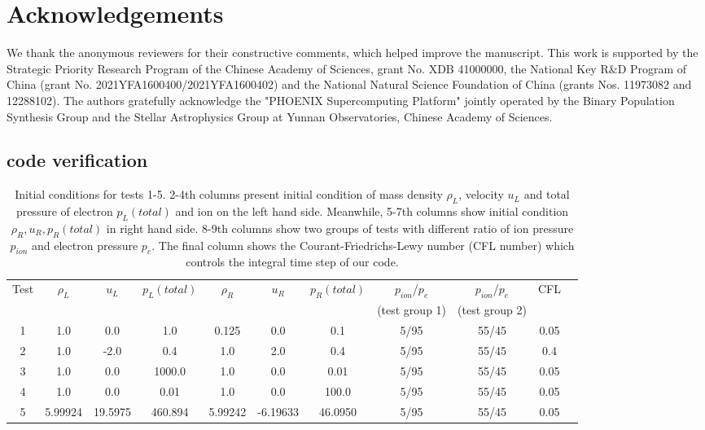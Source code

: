 \documentclass[journal, onecolumn]{aastex631}
\begin{document}
\begin{CJK*}{UTF8}{gbsn}
\section{Acknowledgements} \label{sec:ackn}


\begin{acknowledgements}
We thank the anonymous reviewers for their constructive comments, which helped improve the manuscript. This work is supported by the Strategic Priority Research Program of the Chinese Academy of Sciences, grant No. XDB 41000000, the National Key R$\&$D Program of China (grant No. 2021YFA1600400/2021YFA1600402) and the National Natural Science Foundation of China (grants Nos. 11973082 and 12288102). The authors gratefully acknowledge the "PHOENIX Supercomputing Platform" jointly operated by the Binary Population Synthesis Group and the Stellar Astrophysics Group at Yunnan Observatories, Chinese Academy of Sciences.

\end{acknowledgements}




\begin{appendix}
\section{code verification} \label{app:code}


\begin{table}[!t]

\begin{threeparttable}[t]
\centering
\caption{Initial conditions for tests 1-5. 2-4th columns present initial condition of mass density $\rho_L$, velocity $u_L$ and total pressure of electron $p_L(total)$ and ion on the left hand side. Meanwhile, 5-7th columns show initial condition $\rho_R, u_R, p_R(total)$ in right hand side. 8-9th columns show two groups of tests with different ratio of ion pressure $p_{ion}$ and electron pressure $p_e$. The final column shows the Courant-Friedrichs-Lewy number (CFL number) which controls the integral time step of our code.}
\begin{tabular}{ccccccccccc}

\toprule
 Test& $\rho_L$ & $u_L$ & $p_L(total)$ & $\rho_R$ & $u_R$ & $p_R(total)$ & $p_{ion}$/$p_e$ & $p_{ion}$/$p_e$ & CFL &\\
  &&&&&&&(test group 1)&(test group 2)&\\

\midrule
  1& 1.0& 0.0& 1.0& 0.125& 0.0& 0.1& 5/95& 55/45& 0.05& \\
  2& 1.0& -2.0& 0.4& 1.0& 2.0& 0.4& 5/95& 55/45& 0.4&\\
  3& 1.0& 0.0& 1000.0& 1.0& 0.0& 0.01& 5/95& 55/45& 0.05&\\
  4& 1.0& 0.0& 0.01& 1.0& 0.0& 100.0& 5/95& 55/45& 0.05&\\
  5& 5.99924& 19.5975& 460.894
   & 5.99242& -6.19633& 46.0950 & 5/95 & 55/45& 0.05&\\


\end{tabular}
\end{threeparttable}
\end{table}
\end{appendix}
\end{CJK*}
\end{document}
